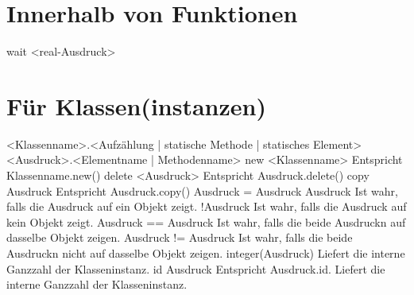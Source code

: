 \section{Innerhalb von Funktionen}
wait <real-Ausdruck>

\section{Für Klassen(instanzen)}
<Klassenname>.<Aufzählung | statische Methode | statisches Element>
<Ausdruck>.<Elementname | Methodenname>
new <Klassenname>				Entspricht Klassenname.new()
delete <Ausdruck>				Entspricht Ausdruck.delete()
copy Ausdruck					Entspricht Ausdruck.copy()
Ausdruck = Ausdruck
Ausdruck					Ist wahr, falls die Ausdruck auf ein Objekt zeigt.
!Ausdruck					Ist wahr, falls die Ausdruck auf kein Objekt zeigt.
Ausdruck == Ausdruck				Ist wahr, falls die beide Ausdruckn auf dasselbe Objekt zeigen.
Ausdruck != Ausdruck				Ist wahr, falls die beide Ausdruckn nicht auf dasselbe Objekt zeigen.
integer(Ausdruck)				Liefert die interne Ganzzahl der Klasseninstanz.
id Ausdruck					Entspricht Ausdruck.id. Liefert die interne Ganzzahl der Klasseninstanz.